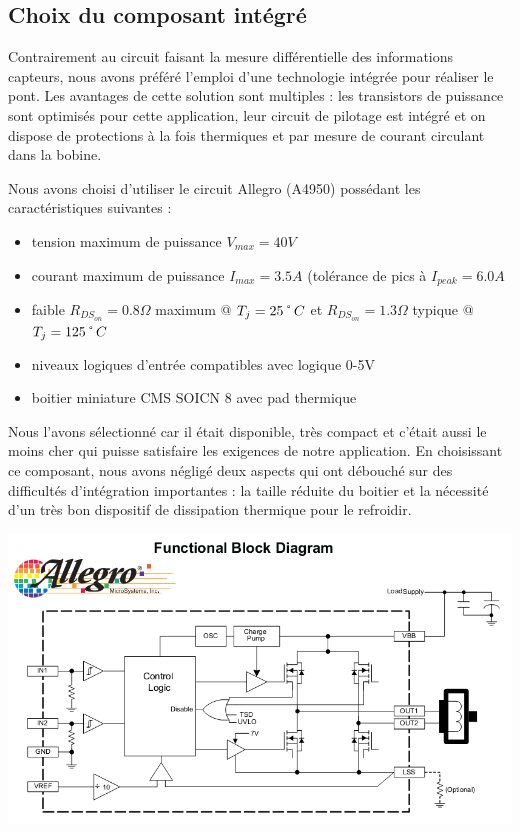 \documentclass[11pt, french]{article} %
\begin{document}
\subsection{Choix du composant intégré}

Contrairement au circuit faisant la mesure différentielle des informations capteurs, nous avons préféré l'emploi d'une technologie intégrée pour réaliser le pont. Les avantages de cette solution sont multiples : les transistors de puissance sont optimisés pour cette application, leur circuit de pilotage est intégré et on dispose de protections à la fois thermiques et par mesure de courant circulant dans la bobine.

\medskip
\noindent
Nous avons choisi d'utiliser le circuit Allegro (A4950) possédant les caractéristiques suivantes :
\medskip
\begin{itemize}
	\item tension maximum de puissance $ V_{max} = 40 V $
	\item courant maximum de puissance $ I_{max} = 3.5 A $ \newline
	(tolérance de pics à $ I_{peak} = 6.0 A$
	\item faible $R_{DS_{on}} = 0.8 \Omega $ maximum @ $ T_j = 25 \char23 C $ \newline
	et $R_{DS_{on}} = 1.3 \Omega $ typique @ $ T_j = 125 \char23 C $
	\item niveaux logiques d'entrée compatibles avec logique 0-5V
	\item boitier miniature CMS SOICN 8 avec pad thermique
\end {itemize}

\medskip
Nous l'avons sélectionné car il était disponible, très compact et c'était aussi le moins cher qui puisse satisfaire les exigences de notre application. En choisissant ce composant, nous avons négligé deux aspects qui ont débouché sur des difficultés d'intégration importantes : la taille réduite du boitier et la nécessité d'un très bon dispositif de dissipation thermique pour le refroidir.

\begin{center}
\includegraphics[width = 15cm]{SolutionAnalogique/A4950.png} 
\end{center}
\end{document}
